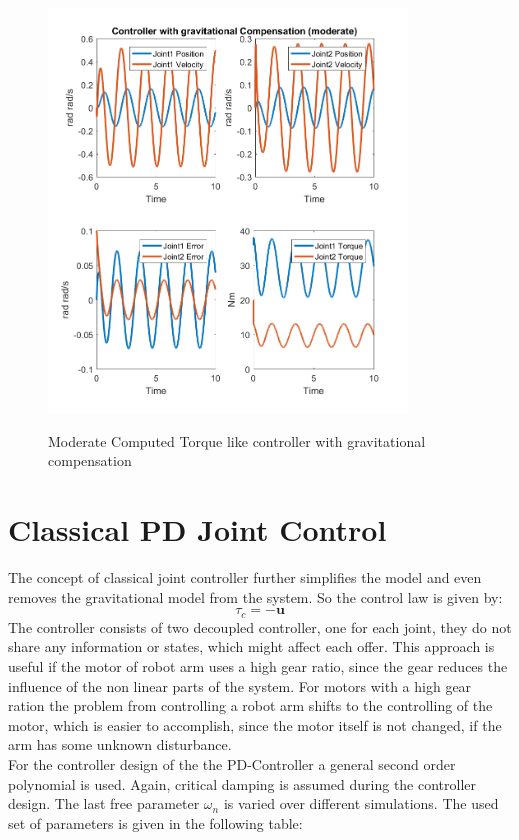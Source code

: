 \begin{figure}[]
	\centering
	\includegraphics[width=0.85\textwidth]{pics/Controllerwithgravitationalcompensation(moderate).png}\\
	\caption{Moderate Computed Torque like controller with gravitational compensation}
	\label{fig:ctLike_pd2}
\end{figure}

\section{Classical PD Joint Control}

The concept of classical joint controller further simplifies the model and even removes the gravitational model from the system. So the control law is given by:
\begin{equation*}
	\tau_c = -\mathbf{u}
\end{equation*}
The controller consists of two decoupled controller, one for each joint, they do not share any information or states, which might affect each offer. This approach is useful if the motor of robot arm uses a high gear ratio, since the gear reduces the influence of the non linear parts of the system. For motors with a high gear ration the problem from controlling a robot arm shifts to the controlling of the motor, which is easier to accomplish, since the motor itself is not changed, if the arm has some unknown disturbance.\\
For the controller design of the the PD-Controller a general second order polynomial is used. Again, critical damping is assumed during the controller design. The last free parameter $\omega_n$ is varied over different simulations. The used set of parameters is given in the following table:\\[1cm]

